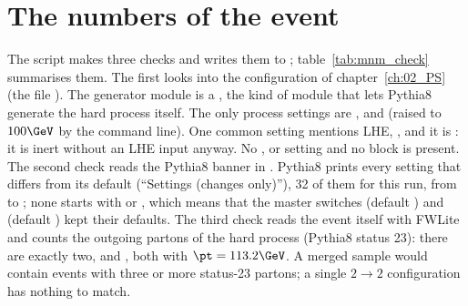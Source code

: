 \section{The numbers of the event}

The script  makes three checks and writes them to
; table~\ref{tab:mnm_check} summarises them. The first looks into the
configuration of chapter~\ref{ch:02_PS} (the file ). The generator
module is a , the kind of module that lets Pythia8 generate the hard process
itself. The only process settings are ,  and
 (raised to $100\GeV$ by the command line). One common setting mentions LHE,
, and it is : it is inert without an LHE input anyway. No
,  or  setting and no  block is present.
The second check reads the Pythia8 banner in . Pythia8 prints every setting
that differs from its default (``Settings (changes only)''), 32 of them for this run, from  to
; none starts with  or , which means that the
master switches  (default ) and  (default ) kept
their defaults. The third check reads the event itself with FWLite and counts the outgoing partons of the hard
process (Pythia8 status 23): there are exactly two,  and , both with $\pt=113.2\GeV$. A
merged sample would contain events with three or more status-23 partons; a single $2\to2$ configuration has nothing
to match.

